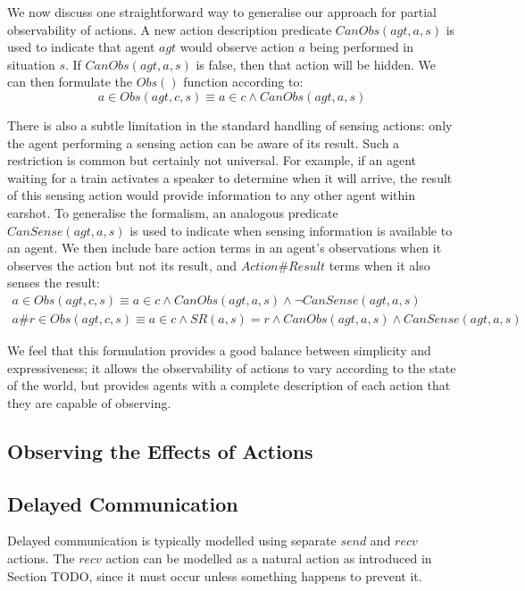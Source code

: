 We now discuss one straightforward way to generalise our approach
for partial observability of actions. A new action description predicate
$CanObs(agt,a,s)$ is used to indicate that agent $agt$ would observe
action $a$ being performed in situation $s$. If $CanObs(agt,a,s)$
is false, then that action will be hidden. We can then formulate the
$Obs()$ function according to:\[
a\in Obs(agt,c,s)\equiv a\in c\wedge CanObs(agt,a,s)\]


There is also a subtle limitation in the standard handling of sensing
actions: only the agent performing a sensing action can be aware of
its result. Such a restriction is common but certainly not universal.
For example, if an agent waiting for a train activates a speaker to
determine when it will arrive, the result of this sensing action would
provide information to any other agent within earshot. To generalise
the formalism, an analogous predicate $CanSense(agt,a,s)$ is used
to indicate when sensing information is available to an agent. We
then include bare action terms in an agent's observations when it
observes the action but not its result, and \emph{$Action\#Result$}
terms when it also senses the result:\begin{gather*}
a\in Obs(agt,c,s)\equiv a\in c\wedge CanObs(agt,a,s)\wedge\neg CanSense(agt,a,s)\\
a\#r\in Obs(agt,c,s)\equiv a\in c\wedge SR(a,s)=r\wedge CanObs(agt,a,s)\wedge CanSense(agt,a,s)\end{gather*}


We feel that this formulation provides a good balance between simplicity
and expressiveness; it allows the observability of actions to vary
according to the state of the world, but provides agents with a complete
description of each action that they are capable of observing.


\subsection{Observing the Effects of Actions}


\subsection{Delayed Communication}

Delayed communication is typically modelled using separate $send$
and $recv$ actions. The $recv$ action can be modelled as a natural
action as introduced in Section TODO, since it must occur unless something
happens to prevent it.

